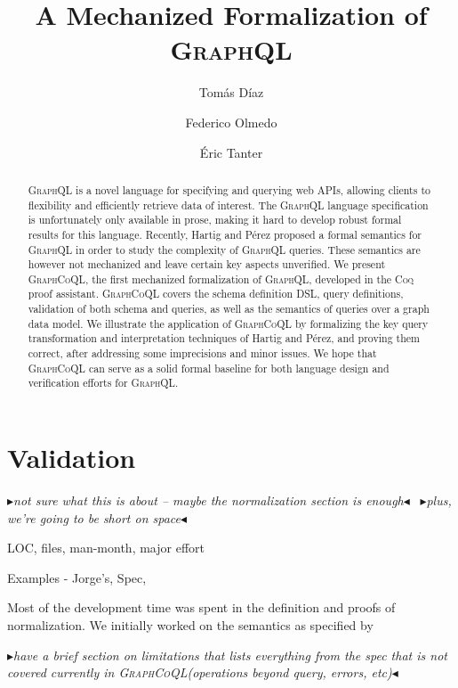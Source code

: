 \documentclass[sigplan,10pt,anonymous,review,nonacm]{acmart}
\newcommand{\mynote}[3]
    {{\color{#3} \fbox{\bfseries\sffamily\scriptsize#1}
    {\small$\blacktriangleright$\textsf{\emph{#2}}$\blacktriangleleft$}}~}
\newcommand{\et}[1]{\mynote{ET}{#1}{purple}}
\newcommand{\plstyle}[1]{\mbox{\textsc{#1}}\xspace}
\newcommand{\gql}{\plstyle{GraphQL}}
\newcommand{\gcoql}{\plstyle{GraphCoQL}}
\newcommand{\coq}{\plstyle{Coq}}
\begin{document}
\title{A Mechanized Formalization of \gql}
\author{Tomás Díaz}

\author{Federico Olmedo}
\author{Éric Tanter}

\begin{abstract}
\gql is a novel language for specifying and querying web APIs, allowing clients to flexibility and efficiently retrieve data of interest. The \gql language specification is unfortunately only available in prose, making it hard to develop robust formal results for this language. Recently, Hartig and Pérez proposed a formal semantics for \gql in order to study the complexity of \gql queries. These semantics are however not mechanized and leave certain key aspects unverified. We present \gcoql, the first mechanized formalization of \gql, developed in the \coq proof assistant.  \gcoql covers the schema definition DSL, query definitions, validation of both schema and queries, as well as the semantics of queries over a graph data model.
We illustrate the application of \gcoql by formalizing the key query transformation and interpretation techniques of Hartig and Pérez, and proving them correct, after addressing some imprecisions and minor issues. 
We hope that \gcoql can serve as a solid formal baseline for both language design and verification efforts for \gql.
\end{abstract}


\maketitle






%

\section{Validation}\label{sec:valid}
\et{not sure what this is about -- maybe the normalization section is enough}
\et{plus, we're going to be short on space}


LOC, files, man-month, major effort

Examples - Jorge's, Spec,

Most of the development time was spent in the definition and proofs of normalization.
We initially worked on the semantics as specified by \cite{gqlph}

\et{have a brief section on limitations that lists everything from the spec that is not covered currently in \gcoql (operations beyond query, errors, etc)}






\end{document}
